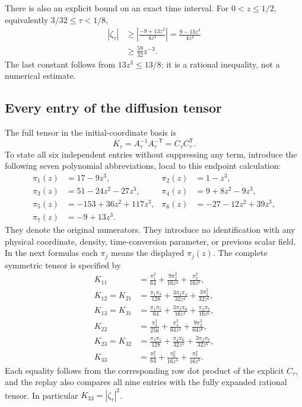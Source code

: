 There is also an explicit bound on an exact time interval. For
\(0<z\le1/2\), equivalently \(3/32\le\tau<1/8\),
\[
\begin{aligned}
|\zeta_\tau|
&\ge\left|\frac{-9+13z^3}{4z^3}\right|
 =\frac{9-13z^3}{4z^3}\\
&\ge\frac{59}{32}z^{-3}.
\end{aligned}
\]
The last constant follows from \(13z^3\le13/8\); it is a rational
inequality, not a numerical estimate.

\subsection{Every entry of the diffusion tensor}

The full tensor in the initial-coordinate basis is
\[
K_\tau=A_\tau^{-1}A_\tau^{-\mathsf T}
=C_\tau C_\tau^{\mathsf T}.
\]
To state all six independent entries without suppressing any term,
introduce the following seven polynomial abbreviations, local to this
endpoint calculation:
\[
\begin{aligned}
\pi_1(z)&=17-9z^3,&
\pi_2(z)&=1-z^3,\\
\pi_3(z)&=51-24z^2-27z^3,&
\pi_4(z)&=9+8z^2-9z^3,\\
\pi_5(z)&=-153+36z^2+117z^3,&
\pi_6(z)&=-27-12z^2+39z^3,\\
\pi_7(z)&=-9+13z^3.
\end{aligned}
\]
They denote the original numerators. They introduce no identification
with any physical coordinate, density, time-conversion parameter, or
previous scalar field. In the next formulas each \(\pi_j\) means the
displayed \(\pi_j(z)\). The complete symmetric tensor is specified by
\[
\begin{aligned}
K_{11}
 &=\frac{\pi_1^2}{64}
   +\frac{9\pi_2^2}{16z^4}+\frac{\pi_2^2}{16z^6},\\
K_{12}=K_{21}
 &=\frac{\pi_1\pi_3}{128}
   +\frac{3\pi_2\pi_4}{32z^4}+\frac{3\pi_2^2}{32z^6},\\
K_{13}=K_{31}
 &=\frac{\pi_1\pi_5}{64}
   +\frac{3\pi_2\pi_6}{16z^4}+\frac{\pi_2\pi_7}{16z^6},\\
K_{22}
 &=\frac{\pi_3^2}{256}
   +\frac{\pi_4^2}{64z^4}+\frac{9\pi_2^2}{64z^6},\\
K_{23}=K_{32}
 &=\frac{\pi_3\pi_5}{128}
   +\frac{\pi_4\pi_6}{32z^4}+\frac{3\pi_2\pi_7}{32z^6},\\
K_{33}
 &=\frac{\pi_5^2}{64}
   +\frac{\pi_6^2}{16z^4}+\frac{\pi_7^2}{16z^6}.
\end{aligned}
\]
Each equality follows from the corresponding row dot product of the
explicit \(C_\tau\), and the replay also compares all nine entries with
the fully expanded rational tensor. In particular \(K_{33}=|\zeta_\tau|^2\).

